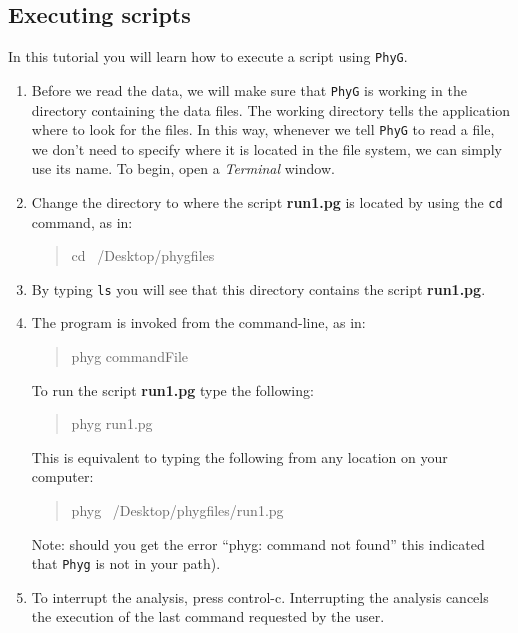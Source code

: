 \documentclass[11pt]{article}
\newcommand{\phyg}{\texttt{PhyG} }
\begin{document}
\subsection{Executing scripts}
\label{subsec:executing}

In this tutorial you will learn how to execute a script using \texttt{PhyG}. 

\begin{enumerate}

\item Before we read the data, we will make sure that \phyg is working in the directory 
containing the data files. The working directory tells the application where to look 
for the files. In this way, whenever we tell \phyg to read a file, we don't need to 
specify where it is located in the file system, we can simply use its name. To 
begin, open a \textit{Terminal} window.
        
\item Change the directory to where the script \textbf{run1.pg} is located by using the 
\texttt{cd} command, as in:
		
	\begin{quote}
	cd ~/Desktop/phygfiles
	\end{quote}
   
\item By typing \texttt{ls} you will see that this directory contains the script 
\textbf{run1.pg}.

\item The program is invoked from the command-line, as in:
		
	\begin{quote}
	phyg commandFile
	\end{quote}
	
To run the script \textbf{run1.pg} type the following:
		
	\begin{quote}
  	phyg run1.pg
	\end{quote}
	
This is equivalent to typing the following from any location on your computer:
	
	\begin{quote}
  	phyg ~/Desktop/phygfiles/run1.pg
	\end{quote}

Note: should you get the error ``phyg: command not found'' this indicated that 
\texttt{Phyg} is not in your path). 
	
\item To interrupt the analysis, press control-c. Interrupting the analysis cancels 
the execution of the last command requested by the user. 

\end{enumerate}
\end{document}
